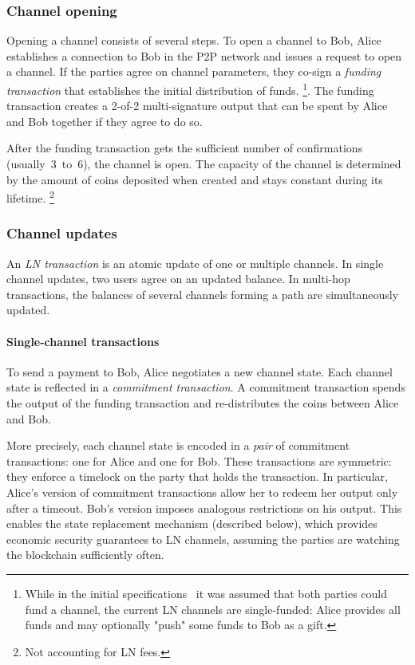 \subsubsection*{Channel opening}

Opening a channel consists of several steps.
To open a channel to Bob, Alice establishes a connection to Bob in the P2P network and issues a request to open a channel.
If the parties agree on channel parameters, they co-sign a \textit{funding transaction} that establishes the initial distribution of funds.
\footnote{While in the initial specifications~\cite{Poon2016} it was assumed that both parties could fund a channel, the current LN channels are single-funded: Alice provides all funds and may optionally "push" some funds to Bob as a gift.}.
The funding transaction creates a 2-of-2 multi-signature output that can be spent by Alice and Bob together if they agree to do so.

After the funding transaction gets the sufficient number of confirmations (usually~$3$~to~$6$), the channel is open.
The capacity of the channel is determined by the amount of coins deposited when created and stays constant during its lifetime.
\footnote{Not accounting for LN fees.}

\subsubsection*{Channel updates}

An \textit{LN transaction} is an atomic update of one or multiple channels.
In single channel updates, two users agree on an updated balance.
In multi-hop transactions, the balances of several channels forming a path are simultaneously updated.

\paragraph{Single-channel transactions}

To send a payment to Bob, Alice negotiates a new channel state.
Each channel state is reflected in a \textit{commitment transaction}.
A commitment transaction spends the output of the funding transaction and re-distributes the coins between Alice and Bob.

More precisely, each channel state is encoded in a \textit{pair} of commitment transactions: one for Alice and one for Bob.
These transactions are symmetric: they enforce a timelock on the party that holds the transaction.
In particular, Alice's version of commitment transactions allow her to redeem her output only after a timeout.
Bob's version imposes analogous restrictions on his output.
This enables the state replacement mechanism (described below), which provides economic security guarantees to LN channels, assuming the parties are watching the blockchain sufficiently often.

